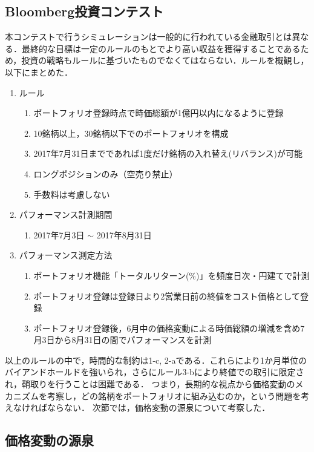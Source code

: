 ﻿\documentclass[a4paper]{jarticle}
\begin{document}
\subsection{Bloomberg投資コンテスト}
本コンテストで行うシミュレーションは一般的に行われている金融取引とは異なる．最終的な目標は一定のルールのもとでより高い収益を獲得することであるため，投資の戦略もルールに基づいたものでなくてはならない．ルールを概観し，以下にまとめた．

\begin{enumerate}
\item ルール
\begin{enumerate}
\item ポートフォリオ登録時点で時価総額が1億円以内になるように登録
\item 10銘柄以上，30銘柄以下でのポートフォリオを構成
\item 2017年7月31日までであれば1度だけ銘柄の入れ替え(リバランス)が可能
\item ロングポジションのみ（空売り禁止）
\item 手数料は考慮しない
\end{enumerate}

\item パフォーマンス計測期間
\begin{enumerate}
\item  2017年7月3日 $\sim$ 2017年8月31日
\end{enumerate}

\item パフォーマンス測定方法
\begin{enumerate}
\item ポートフォリオ機能「トータルリターン(\%)」を頻度日次・円建てで計測
\item ポートフォリオ登録は登録日より2営業日前の終値をコスト価格として登録
\item ポートフォリオ登録後，6月中の価格変動による時価総額の増減を含め7月3日から8月31日の間でパフォーマンスを計測
\end{enumerate}
\end{enumerate}

以上のルールの中で，時間的な制約は1-c, 2-aである．これらにより1か月単位のバイアンドホールドを強いられ，さらにルール3-bにより終値での取引に限定され，鞘取りを行うことは困難である．
つまり，長期的な視点から価格変動のメカニズムを考察し，どの銘柄をポートフォリオに組み込むのか，という問題を考えなければならない．
次節では，価格変動の源泉について考察した．

\subsection{価格変動の源泉}
\end{document}
